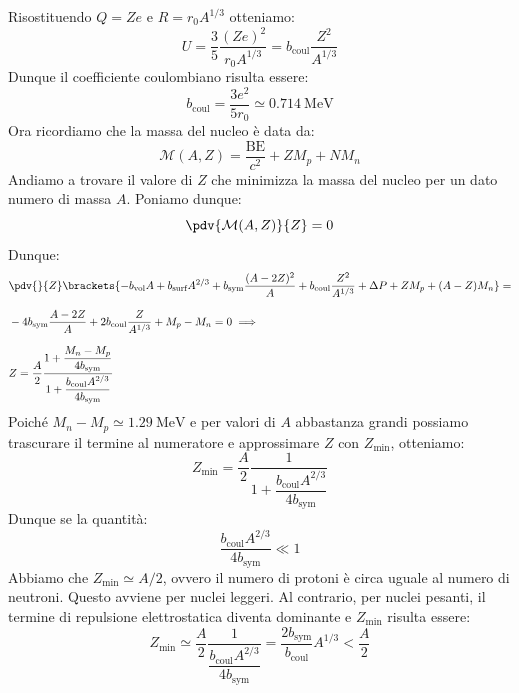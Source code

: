 Risostituendo $Q = Ze$ e $R = r_0 A^{1/3}$ otteniamo:
\begin{equation}
 U = \dfrac{3}{5} \dfrac{(Ze)^2}{r_0 A^{1/3}} = b_{\text{coul}} \dfrac{Z^2}{A^{1/3}}
\end{equation}
Dunque il coefficiente coulombiano risulta essere:
\begin{equation}
 b_{\text{coul}} = \dfrac{3 e^2}{5 r_0} \simeq \qty{0.714}{\mega\electronvolt}
\end{equation}
Ora ricordiamo che la massa del nucleo è data da:
\begin{equation}
 \mathcal{M}(A,Z) = \dfrac{\text{BE}}{c^2} + ZM_p + N M_n
\end{equation}
Andiamo a trovare il valore di $Z$ che minimizza la massa del nucleo per un dato numero di massa $A$. Poniamo dunque:
\begin{equation}
 \pdv{\mathcal{M}(A,Z)}{Z} = 0
\end{equation}
Dunque:
\begin{equation}
 \begin{split}
  &\pdv{}{Z} \brackets{-b_{\text{vol}} A + b_{\text{surf}} A^{2/3} + b_{\text{sym}} \dfrac{(A-2Z)^2}{A} + b_{\text{coul}} \dfrac{Z^2}{A^{1/3}} + \Delta P + ZM_p + (A-Z) M_n} = \\[8pt]
  &-4b_{\text{sym}} \dfrac{A-2Z}{A} + 2b_{\text{coul}} \dfrac{Z}{A^{1/3}} + M_p - M_n = 0 \implies \\[8pt]
  &Z = \dfrac{A}{2} \dfrac{1 + \dfrac{M_n - M_p}{4 b_{\text{sym}}}}{1 + \dfrac{b_{\text{coul}} A^{2/3}}{4 b_{\text{sym}}}}
 \end{split}
\end{equation}
Poiché $M_n - M_p \simeq \qty{1.29}{\mega\electronvolt}$ e per valori di $A$ abbastanza grandi possiamo trascurare il termine al numeratore e approssimare $Z$ con $Z_{\text{min}}$, otteniamo:
\begin{equation}
 Z_{\text{min}} = \dfrac{A}{2} \dfrac{1}{1 + \dfrac{b_{\text{coul}} A^{2/3}}{4 b_{\text{sym}}}}
\end{equation}
Dunque se la quantità:
\begin{equation}
  \dfrac{b_{\text{coul}} A^{2/3}}{4 b_{\text{sym}}} \ll 1
\end{equation}
Abbiamo che $Z_{\text{min}} \simeq A/2$, ovvero il numero di protoni è circa uguale al numero di neutroni. Questo avviene per nuclei leggeri. Al contrario, per nuclei pesanti, il termine di repulsione elettrostatica diventa dominante e $Z_{\text{min}}$ risulta essere:
\begin{equation}
  Z_{\text{min}} \simeq \dfrac{A}{2} \dfrac{1}{\dfrac{b_{\text{coul}} A^{2/3}}{4 b_{\text{sym}}}} = \dfrac{2 b_{\text{sym}}}{b_{\text{coul}}} A^{1/3} < \dfrac{A}{2}
\end{equation}
